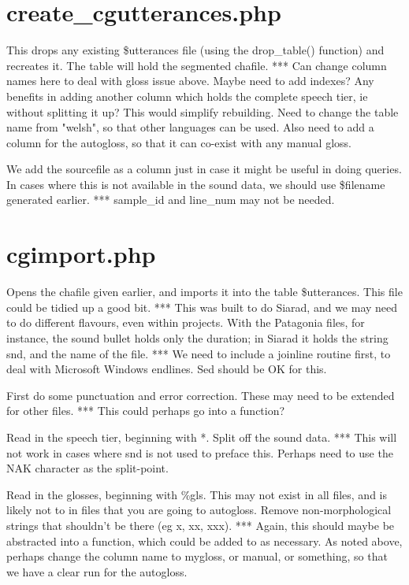 \documentclass[a4paper,10pt]{article}
\begin{document}
\section{create\_cgutterances.php}

This drops any existing \$utterances file (using the drop\_table() function) and recreates it.  The table will hold the segmented chafile.
*** Can change column names here to deal with gloss issue above.  Maybe need to add indexes?  Any benefits in adding another column which holds the complete speech tier, ie without splitting it up?  This would simplify rebuilding.  Need to change the table name from "welsh", so that other languages can be used.  Also need to add a column for the autogloss, so that it can co-exist with any manual gloss.

We add the sourcefile as a column just in case it might be useful in doing queries.  In cases where this is not available in the sound data, we should use \$filename generated earlier.
*** sample\_id and line\_num may not be needed.


\section{cgimport.php}

Opens the chafile given earlier, and imports it into the table \$utterances.  This file could be tidied up a good bit.
*** This was built to do Siarad, and we may need to do different flavours, even within projects.  With the Patagonia files, for instance, the sound bullet holds only the duration; in Siarad it holds the string snd, and the name of the file.
*** We need to include a joinline routine first, to deal with Microsoft Windows endlines.  Sed should be OK for this.

First do some punctuation and error correction.  These may need to be extended for other files.
*** This could perhaps go into a function? 

Read in the speech tier, beginning with *.  Split off the sound data.
*** This will not work in cases where snd is not used to preface this.  Perhaps need to use the NAK character as the split-point.

Read in the glosses, beginning with \%gls.  This may not exist in all files, and is likely not to in files that you are going to autogloss.  Remove non-morphological strings that shouldn't be there (eg x, xx, xxx).
*** Again, this should maybe be abstracted into a function, which could be added to as necessary.  As noted above, perhaps change the column name to mygloss, or manual, or something, so that we have a clear run for the autogloss.
\end{document}
